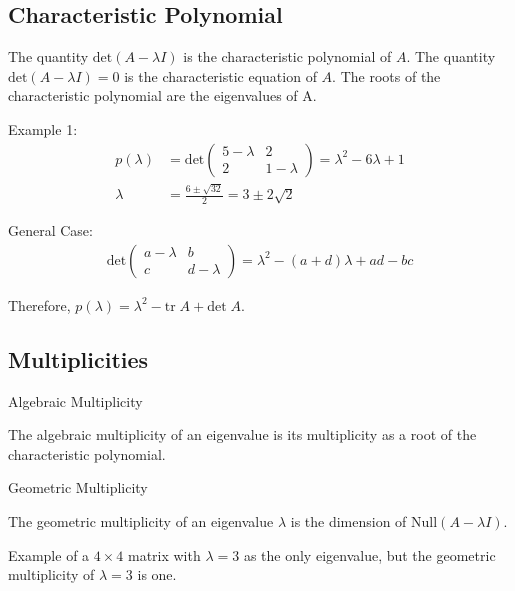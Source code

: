 \subsection{Characteristic Polynomial}
The quantity \(\text{det} (A -\lambda I)\) is the characteristic polynomial of \(A\). The quantity \(\text{det} (A -\lambda I)=0\) is the characteristic equation of \(A\). The roots of the characteristic polynomial are the eigenvalues of A.

\noindent
\newline
Example 1:
\begin{align}
    p(\lambda) &= \text{det} \begin{pmatrix}
        5-\lambda & 2 \\ 2 & 1-\lambda
    \end{pmatrix} = \lambda^2 -6 \lambda + 1 \\
    \lambda &= \frac{6 \pm \sqrt{32}}{2} = 3 \pm 2\sqrt{2}
\end{align}

\noindent
\newline
General Case:
\begin{align}
    \text{det}\begin{pmatrix}
        a-\lambda & b \\ c & d-\lambda
    \end{pmatrix} = \lambda^2 - (a+d)\lambda + ad - bc
\end{align}

\noindent
Therefore, \(p(\lambda) = \lambda^2 - \text{tr} \; A + \text{det} \; A\).

\subsection{Multiplicities}
\begin{definition} Algebraic Multiplicity

    The algebraic multiplicity of an eigenvalue is its multiplicity as a root of the characteristic polynomial.
\end{definition}

\begin{definition} Geometric Multiplicity

    The geometric multiplicity of an eigenvalue \(\lambda\) is the dimension of \(\text{Null} (A-\lambda I)\).
    
\end{definition}

\noindent
\newline
Example of a \(4\times 4\) matrix with \(\lambda = 3\) as the only eigenvalue, but the geometric multiplicity of \(\lambda = 3\) is one.

